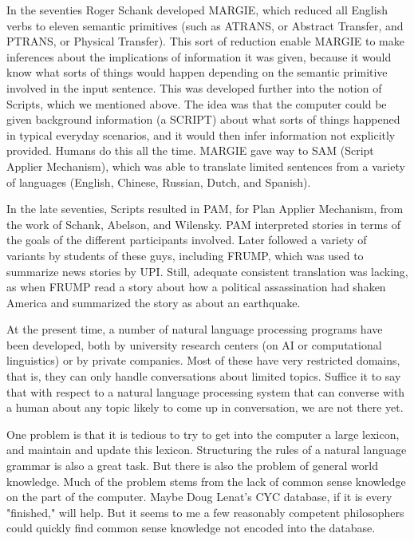 In the seventies Roger Schank developed MARGIE, which reduced all English verbs to eleven semantic primitives (such as ATRANS, or Abstract Transfer, and PTRANS, or Physical Transfer). This sort of reduction enable MARGIE to make inferences about the implications of information it was given, because it would know what sorts of things would happen depending on the semantic primitive involved in the input sentence. This was developed further into the notion of Scripts, which we mentioned above. The idea was that the computer could be given background information (a SCRIPT) about what sorts of things happened in typical everyday scenarios, and it would then infer information not explicitly provided. Humans do this all the time. MARGIE gave way to SAM (Script Applier Mechanism), which was able to translate limited sentences from a variety of languages (English, Chinese, Russian, Dutch, and Spanish).

In the late seventies, Scripts resulted in PAM, for Plan Applier Mechanism, from the work of Schank, Abelson, and Wilensky. PAM interpreted stories in terms of the goals of the different participants involved. Later followed a variety of variants by students of these guys, including FRUMP, which was used to summarize news stories by UPI. Still, adequate consistent translation was lacking, as when FRUMP read a story about how a political assassination had shaken America and summarized the story as about an earthquake.

At the present time, a number of natural language processing programs have been developed, both by university research centers (on AI or computational linguistics) or by private companies. Most of these have very restricted domains, that is, they can only handle conversations about limited topics. Suffice it to say that with respect to a natural language processing system that can converse with a human about any topic likely to come up in conversation, we are not there yet.

One problem is that it is tedious to try to get into the computer a large lexicon, and maintain and update this lexicon. Structuring the rules of a natural language grammar is also a great task. But there is also the problem of general world knowledge. Much of the problem stems from the lack of common sense knowledge on the part of the computer. Maybe Doug Lenat's CYC database, if it is every "finished," will help. But it seems to me a few reasonably competent philosophers could quickly find common sense knowledge not encoded into the database.

